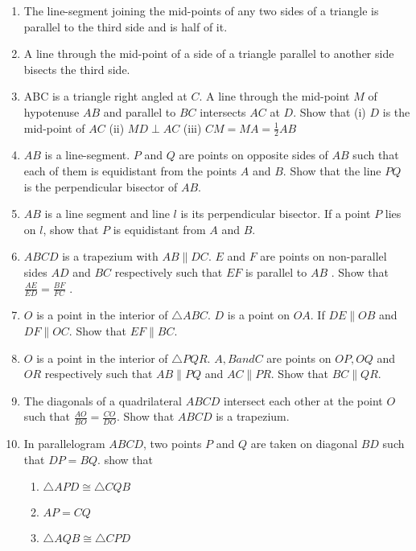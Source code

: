 \begin{enumerate}[label=\thesubsection.\arabic*.,ref=\thesubsection.\theenumi]
\item  The line-segment joining the mid-points of any two sides of a triangle is parallel to the third side and is half of it.
\label{prob:tri_mid_similar}
%
\item  A line through the mid-point of a side of a triangle parallel to another side 
bisects the third side.
\item ABC is a triangle right angled at $C$. A line through the mid-point $M$ of hypotenuse $AB$ and parallel to $BC$ intersects $AC$ at $D$. Show that (i) $D$ is the mid-point of $AC$
(ii) $MD \perp AC$ (iii) $CM = MA = \frac{1}{2}AB$
\item $AB$ is a line-segment. $P$ and $Q$ are points on opposite sides of $AB$ such that each of them is equidistant from the points $A$ and $B$. Show that the line $PQ $ is the perpendicular bisector of $AB$.
%
\item $AB$ is a line segment and line $l$ is its perpendicular bisector. If a point $P$ lies on $l$, show that $P$ is equidistant from $A$ and $B$.
\item $ABCD$ is a trapezium with $AB  \parallel  DC$. $E$ and $F$ are points on non-parallel sides $AD$ and $BC$ respectively such that $EF$ is parallel to $AB$
. Show that
$\frac{AE}{ED}=\frac{ BF}{  FC}$ .
\item $O$ is a point in the interior of $\triangle ABC$. $D$ is a point on $OA$.  If $DE  \parallel  OB$ and $DF  \parallel  OC$. Show that $EF  \parallel  BC$.
\item $O$ is a point in the interior of $\triangle PQR$.  $A, B and C$ are points on $OP, OQ$ and $OR$ respectively such that $AB  \parallel  PQ$ and $AC  \parallel  PR$. Show that $BC  \parallel  QR$.
\item The diagonals of a quadrilateral $ABCD$ intersect each other at the point $O$ such that $\frac{AO}{ BO}=\frac{CO}{  DO}$.   Show that $ABCD$ is a trapezium.
\item In parallelogram $ABCD$, two points $P$ and $Q$ are taken on diagonal $BD$ such that $DP = BQ$. show that \begin{enumerate}
 \item  $\triangle  APD  \cong   \triangle  CQB$ 
\item $AP = CQ$ \item  $\triangle  AQB  \cong   \triangle  CPD$ 

\end{enumerate}
\end{enumerate}
